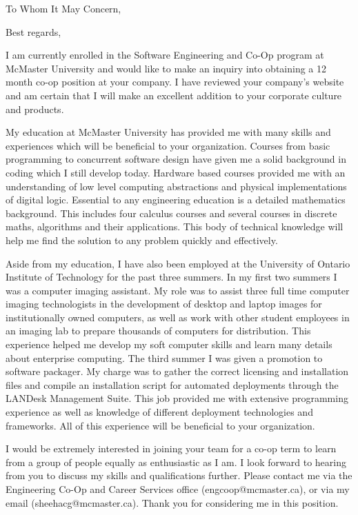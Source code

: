 \documentclass[11pt,a4paper,sans]{moderncv}        %
\begin{document}
\clearpage
\date{Monday, January 11th, 2015}
\opening{To Whom It May Concern,}
\closing{Best regards,}
\makelettertitle
\small{
I am currently enrolled in the Software Engineering and Co-Op program at McMaster University and would like to make an inquiry into obtaining a 12 month co-op position at your company. I have reviewed your company's website and am certain that I will make an excellent addition to your corporate culture and products.

My education at McMaster University has provided me with many skills and experiences which will be beneficial to your organization. Courses from basic programming to concurrent software design have given me a solid background in coding which I still develop today. Hardware based courses provided me with an understanding of low level computing abstractions and physical implementations of digital logic. Essential to any engineering education is a detailed mathematics background. This includes four calculus courses and several courses in discrete maths, algorithms and their applications. This body of technical knowledge will help me find the solution to any problem quickly and effectively.

Aside from my education, I have also been employed at the University of Ontario Institute of Technology for the past three summers. In my first two summers I was a computer imaging assistant. My role was to assist three full time computer imaging technologists in the development of desktop and laptop images for institutionally owned computers, as well as work with other student employees in an imaging lab to prepare thousands of computers for distribution. This experience helped me develop my soft computer skills and learn many details about enterprise computing. The third summer I was given a promotion to software packager. My charge was to gather the correct licensing and installation files and compile an installation script for automated deployments through the LANDesk Management Suite. This job provided me with extensive programming experience as well as knowledge of different deployment technologies and frameworks. All of this experience will be beneficial to your organization.

I would be extremely interested in joining your team for a co-op term to learn from a group of people equally as enthusiastic as I am. I look forward to hearing from you to discuss my skills and qualifications further. Please contact me via the Engineering Co-Op and Career Services office (engcoop@mcmaster.ca), or via my email (sheehacg@mcmaster.ca). Thank you for considering me in this position.}

\makeletterclosing
\end{document}

